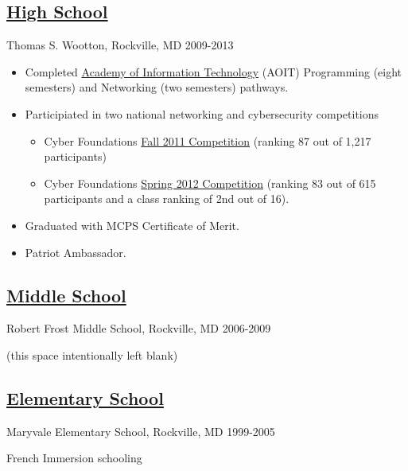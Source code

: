 \documentclass[11pt]{article}
\begin{document}
\subsection*{\underline{High School}} 

Thomas S. Wootton, Rockville, MD \hfill 2009-2013

\begin{itemize}
\item Completed \href{http://woottonaoit.org/}{Academy of Information Technology} (AOIT) Programming (eight semesters) and Networking (two semesters) pathways.
\item Participiated in two national networking and cybersecurity competitions
\begin{itemize}
\item Cyber Foundations \href{http://web.archive.org/web/20120113015059/http://www.uscyberchallenge.org/competitions-camps/cyber-foundations/registration/documents/CyberFoundationsFall2011NationalRankPDFrev12-8.pdf}{Fall 2011 Competition} (ranking 87 out of 1,217 participants)
\item Cyber Foundations \href{https://www.cyberfoundations.org/event/results/2012Spring?page=2}{Spring 2012 Competition} (ranking 83 out of 615 participants and a class ranking of 2nd out of 16).
\end{itemize}
\item Graduated with MCPS Certificate of Merit.
\item Patriot Ambassador. 
\end{itemize}

\subsection*{\underline{Middle School}} 

Robert Frost Middle School, Rockville, MD \hfill 2006-2009

(this space intentionally left blank)

\subsection*{\underline{Elementary School}} 

Maryvale Elementary School, Rockville, MD \hfill 1999-2005

French Immersion schooling
\end{document}
